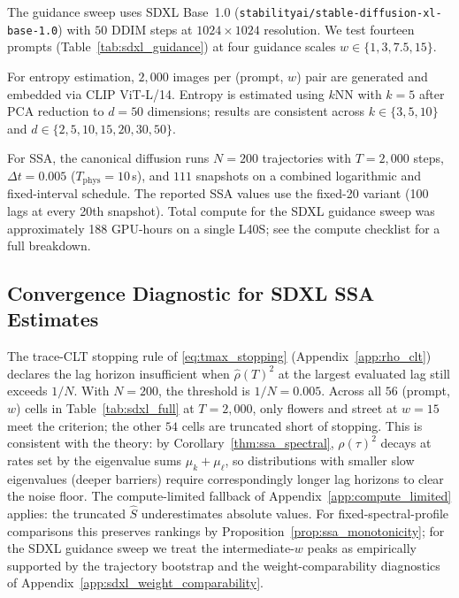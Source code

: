 \documentclass{article}
\begin{document}
The guidance sweep uses SDXL Base~1.0 (\texttt{stabilityai/stable-diffusion-xl-base-1.0}) with $50$ DDIM steps at $1024 \times 1024$ resolution. We test fourteen prompts (Table~\ref{tab:sdxl_guidance}) at four guidance scales $w \in \{1, 3, 7.5, 15\}$.

For entropy estimation, $2{,}000$ images per (prompt, $w$) pair are generated and embedded via CLIP ViT-L/14. Entropy is estimated using $k$NN with $k = 5$ after PCA reduction to $d = 50$ dimensions; results are consistent across $k \in \{3, 5, 10\}$ and $d \in \{2, 5, 10, 15, 20, 30, 50\}$.

For SSA, the canonical diffusion runs $N = 200$ trajectories with $T = 2{,}000$ steps, $\Delta t = 0.005$ ($T_{\mathrm{phys}} = 10$\,s), and $111$ snapshots on a combined logarithmic and fixed-interval schedule. The reported SSA values use the fixed-20 variant (100 lags at every 20th snapshot). Total compute for the SDXL guidance sweep was approximately 188 GPU-hours on a single L40S; see the compute checklist for a full breakdown.


\subsection{Convergence Diagnostic for SDXL SSA Estimates}
\label{app:sdxl_convergence}

The trace-CLT stopping rule of \eqref{eq:tmax_stopping}
(Appendix~\ref{app:rho_clt}) declares the lag horizon insufficient
when $\hat\rho(T)^2$ at the largest evaluated lag still exceeds
$1/N$. With $N = 200$, the threshold is $1/N = 0.005$. Across all
$56$ (prompt, $w$) cells in Table~\ref{tab:sdxl_full} at
$T = 2{,}000$, only flowers and street at $w = 15$ meet the
criterion; the other $54$ cells are truncated short of stopping.
This is consistent with the theory: by
Corollary~\ref{thm:ssa_spectral}, $\rho(\tau)^2$ decays at rates
set by the eigenvalue sums $\mu_k + \mu_\ell$, so distributions
with smaller slow eigenvalues (deeper barriers) require
correspondingly longer lag horizons to clear the noise floor.
The compute-limited fallback of Appendix~\ref{app:compute_limited}
applies: the truncated $\hat S$ underestimates absolute values. For
fixed-spectral-profile comparisons this preserves rankings by
Proposition~\ref{prop:ssa_monotonicity}; for the SDXL guidance sweep
we treat the intermediate-$w$ peaks as empirically supported by the
trajectory bootstrap and the weight-comparability diagnostics of
Appendix~\ref{app:sdxl_weight_comparability}.
\end{document}
